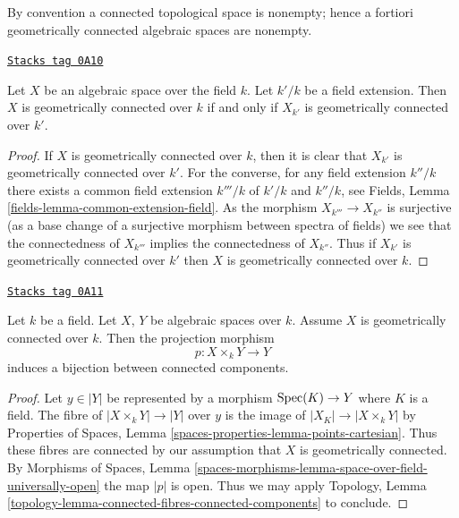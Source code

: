 By convention a connected topological space is nonempty; hence a fortiori
geometrically connected algebraic spaces are nonempty.

\begin{lemma}
\label{spaces-over-fields-lemma-geometrically-connected-check-after-extension}
\href{https://stacks.math.columbia.edu/tag/0A10}{\texttt{Stacks tag 0A10}}

Let $X$ be an algebraic space over the field $k$.
Let $k'/k$ be a field extension.
Then $X$ is geometrically connected over $k$ if and only if
$X_{k'}$ is geometrically connected over $k'$.
\end{lemma}

\begin{proof}
If $X$ is geometrically connected over $k$, then it is clear that
$X_{k'}$ is geometrically connected over $k'$. For the converse,
for any field extension $k''/k$ there exists a common
field extension $k'''/k$ of $k'/k$ and $k''/k$, see
Fields, Lemma \ref{fields-lemma-common-extension-field}. As the
morphism $X_{k'''} \to X_{k''}$ is surjective (as a base change of
a surjective morphism between spectra of fields) we see that the
connectedness of $X_{k'''}$ implies the connectedness of $X_{k''}$.
Thus if $X_{k'}$ is geometrically connected over $k'$ then
$X$ is geometrically connected over $k$.
\end{proof}

\begin{lemma}
\label{spaces-over-fields-lemma-bijection-connected-components}
\href{https://stacks.math.columbia.edu/tag/0A11}{\texttt{Stacks tag 0A11}}

Let $k$ be a field. Let $X$, $Y$ be algebraic spaces over $k$.
Assume $X$ is geometrically connected over $k$.
Then the projection morphism
$$
p : X \times_k Y \longrightarrow Y
$$
induces a bijection between connected components.
\end{lemma}

\begin{proof}
Let $y \in |Y|$ be represented by a morphism $\operatorname{Spec}(K) \to Y$
where $K$ is a field. The fibre of $|X \times_k Y| \to |Y|$ over $y$
is the image of $|X_K| \to |X \times_k Y|$ by
Properties of Spaces, Lemma \ref{spaces-properties-lemma-points-cartesian}.
Thus these fibres are connected by our assumption that $X$ is
geometrically connected. By
Morphisms of Spaces, Lemma
\ref{spaces-morphisms-lemma-space-over-field-universally-open}
the map $|p|$ is open.
Thus we may apply Topology,
Lemma \ref{topology-lemma-connected-fibres-connected-components}
to conclude.
\end{proof}

